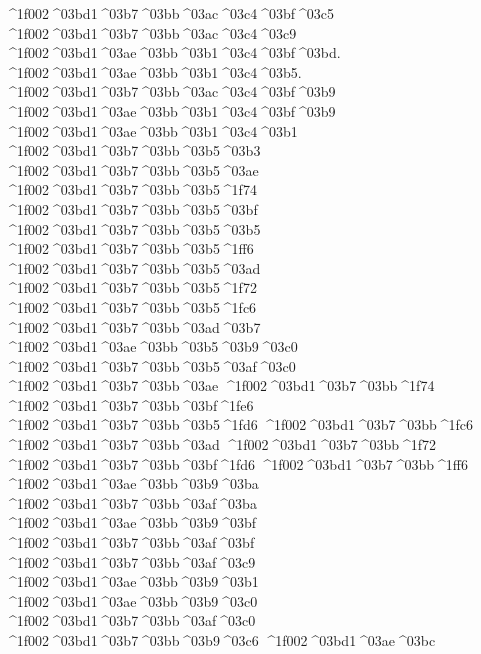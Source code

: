 {^^^^1f002^^^^03bd1^^^^03b7^^^^03bb^^^^03ac^^^^03c4^^^^03bf^^^^03c5
^^^^1f002^^^^03bd1^^^^03b7^^^^03bb^^^^03ac^^^^03c4^^^^03c9
^^^^1f002^^^^03bd1^^^^03ae^^^^03bb^^^^03b1^^^^03c4^^^^03bf^^^^03bd.
^^^^1f002^^^^03bd1^^^^03ae^^^^03bb^^^^03b1^^^^03c4^^^^03b5.
^^^^1f002^^^^03bd1^^^^03b7^^^^03bb^^^^03ac^^^^03c4^^^^03bf^^^^03b9
^^^^1f002^^^^03bd1^^^^03ae^^^^03bb^^^^03b1^^^^03c4^^^^03bf^^^^03b9
^^^^1f002^^^^03bd1^^^^03ae^^^^03bb^^^^03b1^^^^03c4^^^^03b1
^^^^1f002^^^^03bd1^^^^03b7^^^^03bb^^^^03b5^^^^03b3		%
^^^^1f002^^^^03bd1^^^^03b7^^^^03bb^^^^03b5^^^^03ae    		%
^^^^1f002^^^^03bd1^^^^03b7^^^^03bb^^^^03b5^^^^1f74
^^^^1f002^^^^03bd1^^^^03b7^^^^03bb^^^^03b5^^^^03bf
^^^^1f002^^^^03bd1^^^^03b7^^^^03bb^^^^03b5^^^^03b5
^^^^1f002^^^^03bd1^^^^03b7^^^^03bb^^^^03b5^^^^1ff6
^^^^1f002^^^^03bd1^^^^03b7^^^^03bb^^^^03b5^^^^03ad
^^^^1f002^^^^03bd1^^^^03b7^^^^03bb^^^^03b5^^^^1f72
^^^^1f002^^^^03bd1^^^^03b7^^^^03bb^^^^03b5^^^^1fc6
^^^^1f002^^^^03bd1^^^^03b7^^^^03bb^^^^03ad^^^^03b7  	 	%
^^^^1f002^^^^03bd1^^^^03ae^^^^03bb^^^^03b5^^^^03b9^^^^03c0		%
^^^^1f002^^^^03bd1^^^^03b7^^^^03bb^^^^03b5^^^^03af^^^^03c0
^^^^1f002^^^^03bd1^^^^03b7^^^^03bb^^^^03ae		%
^^^^1f002^^^^03bd1^^^^03b7^^^^03bb^^^^1f74
^^^^1f002^^^^03bd1^^^^03b7^^^^03bb^^^^03bf^^^^1fe6
^^^^1f002^^^^03bd1^^^^03b7^^^^03bb^^^^03b5^^^^1fd6
^^^^1f002^^^^03bd1^^^^03b7^^^^03bb^^^^1fc6
^^^^1f002^^^^03bd1^^^^03b7^^^^03bb^^^^03ad
^^^^1f002^^^^03bd1^^^^03b7^^^^03bb^^^^1f72
^^^^1f002^^^^03bd1^^^^03b7^^^^03bb^^^^03bf^^^^1fd6
^^^^1f002^^^^03bd1^^^^03b7^^^^03bb^^^^1ff6
^^^^1f002^^^^03bd1^^^^03ae^^^^03bb^^^^03b9^^^^03ba		%
^^^^1f002^^^^03bd1^^^^03b7^^^^03bb^^^^03af^^^^03ba
^^^^1f002^^^^03bd1^^^^03ae^^^^03bb^^^^03b9^^^^03bf 		%
^^^^1f002^^^^03bd1^^^^03b7^^^^03bb^^^^03af^^^^03bf
^^^^1f002^^^^03bd1^^^^03b7^^^^03bb^^^^03af^^^^03c9
^^^^1f002^^^^03bd1^^^^03ae^^^^03bb^^^^03b9^^^^03b1
^^^^1f002^^^^03bd1^^^^03ae^^^^03bb^^^^03b9^^^^03c0		%
^^^^1f002^^^^03bd1^^^^03b7^^^^03bb^^^^03af^^^^03c0
^^^^1f002^^^^03bd1^^^^03b7^^^^03bb^^^^03b9^^^^03c6    		%
^^^^1f002^^^^03bd1^^^^03ae^^^^03bc    		%
}

